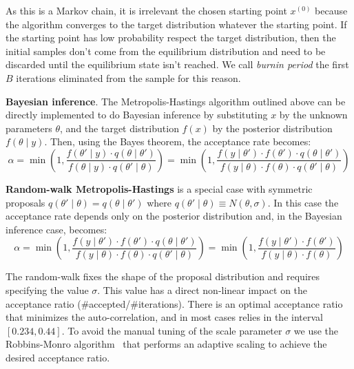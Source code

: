 \documentclass[11pt,fleqn]{book} %
\begin{document}
As this is a Markov chain, it is irrelevant the chosen starting point 
$x^{(0)}$ because the algorithm converges to the target distribution
whatever the starting point. If the starting point has low probability 
respect the target distribution, then the initial samples don't come 
from the equilibrium distribution and need to be discarded until the 
equilibrium state isn't reached. We call \emph{burnin period} the first 
$B$ iterations eliminated from the sample for this reason.

\textbf{Bayesian inference}.
The Metropolis-Hastings algorithm outlined above can be directly implemented 
to do Bayesian inference by substituting $x$ by the unknown parameters 
$\theta$, and the target distribution $f(x)$ by the posterior distribution 
$f(\theta \mid y)$. Then, using the Bayes theorem, the acceptance rate 
becomes:
\begin{displaymath}
	\alpha = \min\left(1,\frac{f(\theta' \mid y) \cdot q(\theta \mid \theta')}{f(\theta \mid y) \cdot q(\theta' \mid \theta)}\right) = \min\left(1,\frac{f(y \mid \theta') \cdot f(\theta') \cdot q(\theta \mid \theta')}{f(y \mid \theta)  \cdot f(\theta) \cdot q(\theta' \mid \theta)}\right)
\end{displaymath}

\textbf{Random-walk Metropolis-Hastings} is a special case with symmetric 
proposals $q(\theta' \mid \theta) = q(\theta \mid \theta')$ where 
$q(\theta' \mid \theta) \equiv N(\theta,\sigma)$. 
In this case the acceptance rate depends only on the posterior distribution
and, in the Bayesian inference case, becomes:
\begin{displaymath}
	\alpha = 
	\min\left(1,\frac{f(y \mid \theta') \cdot f(\theta') \cdot q(\theta \mid \theta')}{f(y \mid \theta)  \cdot f(\theta) \cdot q(\theta' \mid \theta)}\right) = 
	\min\left(1,\frac{f(y \mid \theta') \cdot f(\theta')}{f(y \mid \theta) \cdot f(\theta)}\right)
\end{displaymath}

The random-walk fixes the shape of the proposal distribution and requires 
specifying the value $\sigma$. This value has a direct non-linear impact 
on the acceptance ratio (\#accepted/\#iterations). There is an optimal 
acceptance ratio that minimizes the auto-correlation, and in most cases 
relies in the interval $[0.234,0.44]$. To avoid the  manual tuning of the 
scale parameter $\sigma$ we use the Robbins-Monro algorithm~\cite{garthwaite:2010} 
that performs an adaptive scaling to achieve the desired acceptance ratio.
\end{document}
